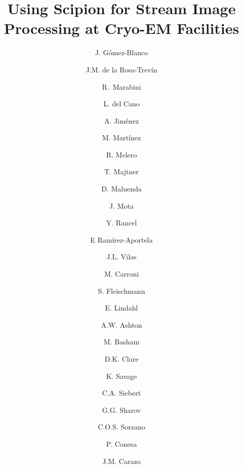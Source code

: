 \documentclass[12, authoryear, preprint]{elsarticle}
\begin{document}
\title{Using Scipion for Stream Image Processing at Cryo-EM Facilities}
\begin{frontmatter}

\author[cnb]{J. G\'{o}mez-Blanco}
\author[su1]{J.M. de la Rosa-Trev\'{i}n}
\author[uam]{R.~Marabini}
\author[cnb]{L. del Cano}
\author[cnb]{A. Jim\'{e}nez}
\author[cnb]{M. Mart\'{i}nez}
\author[cnb]{R. Melero}
\author[cnb]{T. Majtner}
\author[cnb]{D. Maluenda}
\author[cnb]{J. Mota}
\author[cnb]{Y. Rancel}
\author[cnb]{E Ram\'{i}rez-Aportela}
\author[cnb]{J.L. Vilas}
\author[su1]{M. Carroni}
\author[su1]{S. Fleischmann}
\author[su1, su2]{E. Lindahl}
\author[ebic]{A.W. Ashton}
\author[ebic]{M. Basham}
\author[ebic]{D.K. Clare}
\author[ebic]{K. Savage}
\author[ebic]{C.A. Siebert}
\author[mrc]{G.G. Sharov}
\author[cnb]{C.O.S. Sorzano}
\author[cnb]{P. Conesa}
\author[cnb]{J.M. Carazo}


\address[cnb]{Biocomputing Unit, National Center for Biotechnology (CSIC), C/ Darwin, 3, Campus Universidad Aut\'{o}noma, 28049 Cantoblanco, Madrid, Spain.}
\address[su1]{Department of Biochemistry and Biophysics, Science for Life Laboratory, Stockholm University, Stockholm, Sweden} 
\address[uam]{Escuela Polit\'{e}cnica Superior, Universidad Aut\'{o}noma de Madrid, 28049 Cantoblanco, Madrid, Spain.}
\address[su2]{Swedish e-Science Research Center, KTH Royal Institute of Technology, Stockholm, Sweden}
\address[ebic]{Diamond Light Source, Harwell Science and Innovation Campus, Didcot OX11 0DE, United Kingdom}
\address[mrc]{Medical Research Council Laboratory of Molecular Biology, Francis Crick Avenue, Cambridge CB2 OQH, UK}




\end{frontmatter}






\appendix




\clearpage
%

\newpage
%
%
\end{document}
